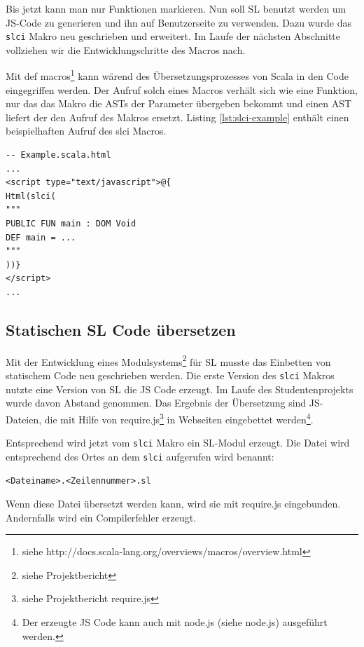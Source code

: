 \documentclass[12pt]{scrreprt}
\begin{document}
Bis jetzt kann man nur Funktionen markieren. Nun soll \ac{SL} benutzt werden um \ac{JS}-Code zu generieren und ihn auf Benutzerseite zu verwenden. Dazu wurde das \lstinline!slci! Makro neu geschrieben und erweitert. Im Laufe der nächsten Abschnitte vollziehen wir die Entwicklungschritte des Macros nach.

Mit def macros\footnote{siehe http://docs.scala-lang.org/overviews/macros/overview.html} kann wärend des Übersetzungsprozesses von Scala in den Code eingegriffen werden. Der Aufruf solch eines Macros verhält sich wie eine Funktion, nur das das Makro die \ac{AST}s der Parameter übergeben bekommt und einen \ac{AST} liefert der den Aufruf des Makros ersetzt. Listing \ref{lst:slci-example} enthält einen beispielhaften Aufruf des slci Macros.

\begin{lstlisting}[caption={Beispielaufruf des slci Macros in einer Play View}, label=lst:slci-example, float=h]
-- Example.scala.html
...
<script type="text/javascript">@{
Html(slci(
"""
PUBLIC FUN main : DOM Void
DEF main = ...
"""
))}
</script>
...
\end{lstlisting}

\subsection{Statischen SL Code übersetzen}
\label{subsec:compile-static-sl}

Mit der Entwicklung eines Modulsystems\footnote{siehe Projektbericht} für \ac{SL} musste das Einbetten von statischem Code neu geschrieben werden. Die erste Version des \lstinline!slci! Makros nutzte eine Version von \ac{SL} die \ac{JS} Code erzeugt. Im Laufe des Studentenprojekts wurde davon Abstand genommen. Das Ergebnis der Übersetzung sind \ac{JS}-Dateien, die mit Hilfe von require.js\footnote{siehe Projektbericht require.js} in Webseiten eingebettet werden\footnote{Der erzeugte \ac{JS} Code kann auch mit node.js (siehe node.js) ausgeführt werden.}.

Entsprechend wird jetzt vom \lstinline!slci! Makro ein \ac{SL}-Modul erzeugt. Die Datei wird entsprechend des Ortes an dem \lstinline!slci! aufgerufen wird benannt:
\begin{center}
\lstinline!<Dateiname>.<Zeilennummer>.sl!
\end{center}
Wenn diese Datei übersetzt werden kann, wird sie mit require.js eingebunden. Andernfalls wird ein Compilerfehler erzeugt. 
\end{document}
